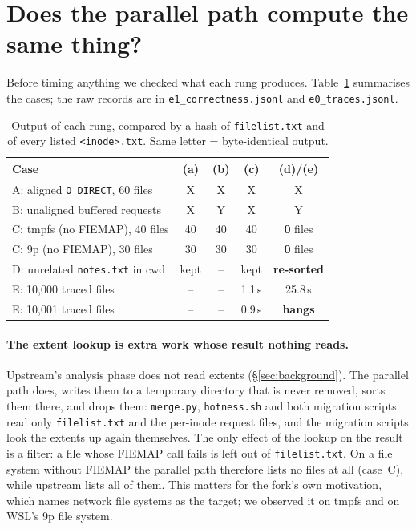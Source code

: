 \section{Does the parallel path compute the same thing?}
\label{sec:correct}

Before timing anything we checked what each rung produces. Table~\ref{tab:correct}
summarises the cases; the raw records are in \texttt{e1\_correctness.jsonl} and
\texttt{e0\_traces.jsonl}.

\begin{table}[t]
\caption{Output of each rung, compared by a hash of \texttt{filelist.txt} and of every
listed \texttt{<inode>.txt}. Same letter = byte-identical output.}
\label{tab:correct}
\small
\begin{tabular}{@{}lcccc@{}}
\toprule
Case & (a) & (b) & (c) & (d)/(e) \\
\midrule
A: aligned \texttt{O\_DIRECT}, 60 files & X & X & X & X \\
B: unaligned buffered requests & X & Y & X & Y \\
C: tmpfs (no FIEMAP), 40 files & 40 & 40 & 40 & \textbf{0} files \\
C: 9p (no FIEMAP), 30 files & 30 & 30 & 30 & \textbf{0} files \\
D: unrelated \texttt{notes.txt} in cwd & kept & -- & kept & \textbf{re-sorted} \\
E: 10{,}000 traced files & -- & -- & 1.1\,s & 25.8\,s \\
E: 10{,}001 traced files & -- & -- & 0.9\,s & \textbf{hangs} \\
\bottomrule
\end{tabular}
\end{table}

\paragraph{The extent lookup is extra work whose result nothing reads.}
Upstream's analysis phase does not read extents (\S\ref{sec:background}). The
parallel path does, writes them to a temporary directory that is never removed,
sorts them there, and drops them: \texttt{merge.py}, \texttt{hotness.sh} and both
migration scripts read only \texttt{filelist.txt} and the per-inode request files,
and the migration scripts look the extents up again themselves. The only effect of
the lookup on the result is a filter: a file whose FIEMAP call fails is left out of
\texttt{filelist.txt}. On a file system without FIEMAP the parallel path therefore
lists no files at all (case~C), while upstream lists all of them. This matters for
the fork's own motivation, which names network file systems as the target; we
observed it on tmpfs and on WSL's 9p file system.

